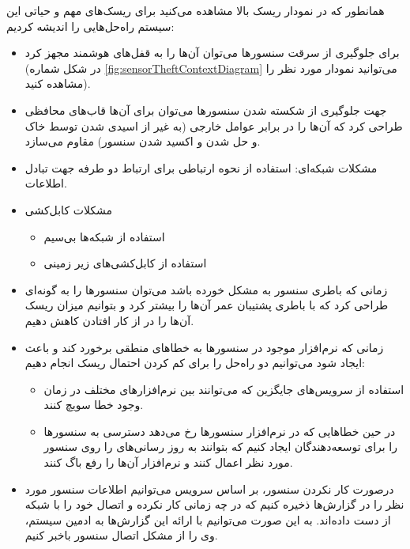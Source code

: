 \documentclass[a4paper]{report}
\begin{document}
همانطور که در نمودار ریسک بالا مشاهده می‌کنید برای ریسک‌های مهم و حیاتی این
سیستم راه‌حل‌هایی را اندیشه کردیم:

\begin{itemize}
    \item برای جلوگیری از سرقت سنسور‌ها می‌توان آن‌ها را به قفل‌های هوشمند مجهز
    کرد (در شکل شماره \ref{fig:sensorTheftContextDiagram} می‌توانید نمودار مورد
    نظر را مشاهده کنید).
    \item جهت جلوگیری از شکسته شدن سنسور‌ها می‌توان برای آن‌ها قاب‌های محافظی
    طراحی کرد که آن‌ها را در برابر عوامل خارجی (به غیر از اسیدی شدن توسط خاک و
    حل شدن و اکسید شدن سنسور) مقاوم می‌سازد.
    \item مشکلات شبکه‌ای: استفاده از نحوه ارتباطی  برای ارتباط دو طرفه
    جهت تبادل اطلاعات.
    \item مشکلات کابل‌کشی
    \begin{itemize}
        \item استفاده از شبکه‌ها بی‌سیم
        \item استفاده از کابل‌کشی‌های زیر زمینی
    \end{itemize}
    \item زمانی که باطری سنسور به مشکل خورده باشد می‌توان سنسور‌ها را به گونه‌ای
    طراحی کرد که با باطری پشتیبان عمر آن‌ها را بیشتر کرد و بتوانیم میزان ریسک
    آن‌ها را در از کار افتادن کاهش دهیم.
    \item زمانی که نرم‌افزار موجود در سنسور‌ها به خطا‌های منطقی برخورد کند و
    باعث ایجاد  شود می‌توانیم دو راه‌حل را برای کم کردن احتمال
    ریسک انجام دهیم:
    \begin{itemize}
        \item استفاده از سرویس‌های جایگزین که می‌توانند بین نرم‌افزار‌های مختلف
        در زمان وجود خطا سویچ کنند.
        \item در حین خطا‌هایی که در نرم‌افزار سنسور‌ها رخ می‌دهد دسترسی به
        سنسور‌ها را برای توسعه‌دهندگان ایجاد کنیم که بتوانند به روز رسانی‌های
         را روی سنسور مورد نظر اعمال کنند و نرم‌افزار آن‌ها را
        رفع باگ کنند.
    \end{itemize}
    \item درصورت کار نکردن سنسور، بر اساس سرویس  می‌توانیم
    اطلاعات سنسور مورد نظر را در گزارش‌ها ذخیره کنیم که در چه زمانی کار نکرده و
    اتصال خود را با شبکه از دست داده‌اند. به این صورت می‌توانیم با ارائه این
    گزارش‌ها به ادمین سیستم، وی را از مشکل اتصال سنسور باخبر کنیم.
\end{itemize}
\end{document}
